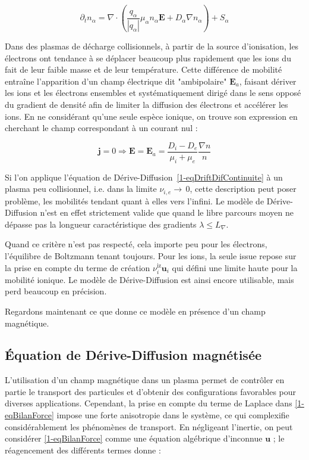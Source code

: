 \begin{refsection}
\begin{equation}
\label{1-eqDriftDifContinuite}
\partial_t
n_\alpha=\nabla\cdot({\frac{q_\alpha}{|q_\alpha|}\mu_\alpha n_\alpha\mathbf E}
+{D_\alpha{\nabla n_\alpha}})+S_\alpha
\end{equation}

Dans des plasmas de décharge collisionnels, à partir de la source d'ionisation,
les électrons ont tendance à se déplacer beaucoup plus rapidement que les ions
du fait de leur faible masse et de leur température. Cette différence de
mobilité entraîne l'apparition d'un champ électrique dit "ambipolaire"
$\mathbf E_a$, faisant dériver les ions et les électrons ensembles et
systématiquement dirigé dans le sens opposé du gradient de densité afin de
limiter la diffusion des électrons et accélérer les ions. En ne considérant
qu'une seule espèce ionique, on trouve son expression en cherchant le champ
correspondant à un courant nul :
 
\begin{equation}
\label{1-eqEAmb}
\mathbf j=0 \Rightarrow \mathbf E=\mathbf
E_a=\frac{D_i-D_e}{\mu_i+\mu_e}\frac{\nabla
n}{n}
\end{equation}

Si l'on applique l'équation de
Dérive-Diffusion~\eqref{1-eqDriftDifContinuite} à un plasma peu collisionnel,
i.e. dans la limite $\nu_{i,e}\rightarrow\,$0, cette description peut poser
problème, les mobilités tendant quant à elles vers l'infini. Le modèle de
Dérive-Diffusion n'est en effet strictement valide que quand le libre parcours
moyen ne dépasse pas la longueur caractéristique des gradients $\lambda\le
L_{\nabla}$.

Quand ce critère n'est pas respecté, cela importe peu pour les
électrons, l'équilibre de
Boltzmann tenant toujours.
Pour les ions, la seule issue repose sur la prise en compte du
terme de création $\nu^\text{iz}_i\mathbf u_i$ qui défini une limite haute pour
la mobilité ionique.
Le modèle de Dérive-Diffusion est ainsi encore utilisable, mais perd beaucoup en
précision.

Regardons maintenant ce que donne ce modèle en présence d'un champ magnétique.

\subsection{Équation de Dérive-Diffusion magnétisée}
\label{1-deriveDiffMag}
L'utilisation d'un champ magnétique dans un plasma permet de contrôler en partie
le transport des particules et d'obtenir des configurations favorables pour
diverses applications. Cependant, la prise en compte du terme de Laplace dans
\eqref{1-eqBilanForce} impose une forte anisotropie dans le système, ce qui
complexifie considérablement les phénomènes de transport. En
négligeant l'inertie, on peut considérer \eqref{1-eqBilanForce} comme une
équation algébrique d'inconnue $\mathbf u$ ; le réagencement des différents
termes donne :


\end{refsection}
